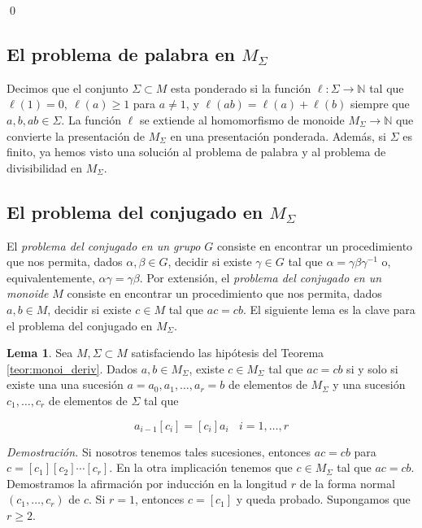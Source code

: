 \documentclass[12pt]{article}
\theoremstyle{definition}
\newtheorem{lema}{Lema}[section]
\begin{document}
\qed

\subsection{El problema de palabra en $M_\Sigma$}

Decimos que el conjunto $\Sigma\subset M$ esta ponderado si la función $\ell:\Sigma\rightarrow\mathbb{N}$ tal que $\ell(1)=0,\ \ell(a)\geq 1$ para $a\neq 1$, y $\ell(ab)=\ell(a)+\ell(b)$ siempre que $a,b,ab\in\Sigma$. La función $\ell$ se extiende al homomorfismo de monoide $M_\Sigma\rightarrow\mathbb{N}$ que convierte la presentación de $M_\Sigma$ en una presentación ponderada. Además, si $\Sigma$ es finito, ya hemos visto una solución al problema de palabra y al problema de divisibilidad en $M_\Sigma$.

\subsection{El problema del conjugado en $M_\Sigma$}
El \textit{problema del conjugado en un grupo} $G$ consiste en encontrar un procedimiento que nos permita, dados $\alpha,\beta\in G$, decidir si existe $\gamma\in G$ tal que $\alpha=\gamma\beta\gamma^{-1}$ o, equivalentemente, $\alpha\gamma=\gamma\beta$. Por extensión, el \textit{problema del conjugado en un monoide} $M$ consiste en encontrar un procedimiento que nos permita, dados $a,b\in M$, decidir si existe $c\in M$ tal que $ac=cb$. El siguiente lema es la clave para el problema del conjugado en $M_\Sigma$.

\begin{lema}
Sea $M,\Sigma\subset M$ satisfaciendo las hipótesis del Teorema \ref{teor:monoi_deriv}. Dados $a,b\in M_\Sigma$, existe $c\in M_\Sigma$ tal que $ac=cb$ si y solo si existe una una sucesión $a=a_0,a_1,\ldots,a_r=b$ de elementos de $M_\Sigma$ y una sucesión $c_1,\ldots,c_r$ de elementos de $\Sigma$ tal que

$$a_{i-1}[c_i]=[c_i]a_i\ \ \ \ i=1,\ldots,r $$

\label{lema:conjugado}
\end{lema}

\textit{Demostración.} Si nosotros tenemos tales sucesiones, entonces $ac=cb$ para $c=[c_1][c_2]\cdots[c_r]$. En la otra implicación tenemos que $c\in M_\Sigma$ tal que $ac=cb$. Demostramos la afirmación por inducción en la longitud $r$ de la forma normal $(c_1,\ldots,c_r)$ de $c$. Si $r=1$, entonces $c = [c_1]$ y queda probado. Supongamos que $r\geq 2$.
\end{document}
